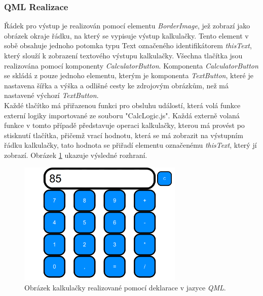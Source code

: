 \documentclass[11pt,twoside,a4paper]{book}
\begin{document}
\subsubsection{QML Realizace}
Řádek pro výstup je realizován pomocí elementu \textit{BorderImage}, jež zobrazí jako obrázek okraje řádku, na který se vypisuje výstup kalkulačky. Tento element v sobě obsahuje jednoho potomka typu Text označeného identifikátorem \textit{thisText}, který slouží k zobrazení textového výstupu kalkulačky.
Všechna tlačítka jsou realizována pomocí komponenty \textit{CalculatorButton}.  Komponenta \textit{CalculatorButton} se skládá z pouze jednoho elementu, kterým je komponenta \textit{TextButton}, které je nastavena šířka a výška a odlišné cesty ke zdrojovým obrázkům, než má nastavené výchozí \textit{TextButton}.\\ Každé tlačítko má přiřazenou funkci pro obsluhu událostí, která volá funkce externí logiky importované ze souboru "CalcLogic.js". Každá externě volaná funkce v tomto případě představuje operaci kalkulačky, kterou má provést po stisknutí tlačítka, přičemž vrací hodnotu, která se má zobrazit na výstupním řádku kalkulačky, tato hodnota se přiřadí elementu označenému \textit{thisText}, který jí zobrazí. Obrázek \ref{fig:outCalcQML} ukazuje výsledné rozhraní.
\begin{figure}[!ht]
\begin{center}
  \includegraphics[width=0.7\textwidth]{qmlCalc}
\caption{{\label{fig:outCalcQML}}Obrázek kalkulačky realizované pomocí deklarace v jazyce \textit{QML}.}
\end{center}
\end{figure}
\end{document}
